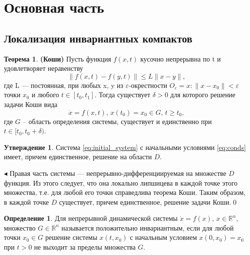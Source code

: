 \documentclass[12pt,a4paper]{extarticle}
\renewenvironment{proof}{\noindent$\blacktriangleleft$}{}
\theoremstyle{definition}
\newtheorem{theorem}{Теорема}
\theoremstyle{definition}
\newtheorem{definition}{Определение}
\theoremstyle{definition}
\newtheorem{affirmation}{Утверждение}
\begin{document}
	\section{Основная часть}
	\subsection{Локализация инвариантных компактов}
	
	\begin{theorem}\textbf{(Коши)}
		Пусть функция $f(x, t)$ кусочно непрерывна по t и удовлетворяет неравенству
		\[\|f(x,t)-f(y,t)\|\leq L\|x-y\|,\]
		где L — постоянная, при любых x, y из $\varepsilon$-окрестности $O_{\varepsilon} = {x : \|x - x_0\| < \varepsilon}$ точки $x_0$ и любого $t \in [t_0,t_1]$. Тогда существует $\delta > 0$ для которого решение задачи Коши вида 
		\[\dot{x}=f(x,t),\, x(t_0)=x_0\in G,\, t\geq t_0,\]
		где $G$ -- область определения системы, существует и единственно при $t\in[t_0,t_0+\delta)$. 
	\end{theorem}
	
	\begin{affirmation}
		 Система \ref{eq:initial_system} с начальными условиями \ref{eq:conds} имеет, причем единственное, решение на области $D$. 
	\end{affirmation}
	\begin{proof}
		Правая часть системы --- непрерывно-дифференциируемая на множестве $D$ функция. Из этого следует, что она локально липшицева в каждой точке этого множества, т.е. для любой его точки справедлива теорема Коши. Таким образом, в каждой точке $D$ существует, причем единственное, решение задачи Коши.\qed
	\end{proof}
	
	\begin{definition}
		Для непрерывной динамической системы $\dot{x}=f(x),\, x\in\mathbb{R}^n$, множество $G\in\mathbb{R}^n$ называется положительно инвариантным, если для любой точки $x_0\in G$ решение системы $x(t,x_0)$ с начальным условием $x(0, x_0)=x_0$ при $t>0$ не выходит за пределы множества $G$. 
	\end{definition}
	
\end{document}
